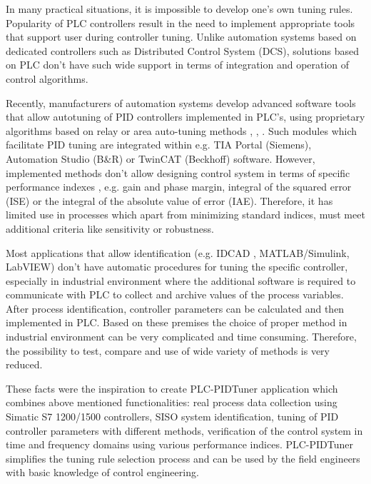 \documentclass{amcs}
\begin{document}
In many practical situations, it is impossible to develop one's own tuning rules. Popularity of PLC controllers result in the need to implement appropriate tools that support user during controller tuning. Unlike automation systems based on dedicated controllers such as Distributed Control System (DCS), solutions based on PLC don't have such wide support in terms of integration and operation of control algorithms. 

Recently, manufacturers of automation systems develop advanced software tools that allow autotuning of PID controllers implemented in PLC's, using  proprietary algorithms based on relay or area auto-tuning methods \cite{Astrom:1995}, \cite{Yu:2006}, \cite{Trybus:2011}. Such modules which facilitate PID tuning are integrated within e.g. TIA Portal (Siemens), Automation Studio (B\&R) or TwinCAT (Beckhoff) software. However, implemented  methods don't allow designing control system in terms of specific performance indexes \cite{Bishop:2010}, \cite{Mozaryn:2013} e.g. gain and phase margin, integral of the squared error (ISE) or the integral of the absolute value of error (IAE). Therefore, it has limited use in processes which apart from minimizing standard indices, must meet additional criteria like sensitivity or robustness. 

Most applications that allow identification (e.g. IDCAD \cite{Janiszowski:2002}, MATLAB/Simulink, LabVIEW) don't have automatic procedures for tuning the specific controller, especially in industrial environment where the additional software is required to communicate with PLC to collect and archive values of the process variables. After process identification, controller parameters can be calculated   \cite{Odwyer:2009} and then implemented in PLC. Based on these premises the choice of proper method in industrial environment can be very complicated and time consuming. Therefore, the possibility to test, compare and use of wide variety of methods is very reduced. 

These facts were the inspiration to create PLC-PIDTuner application which combines above mentioned functionalities: real process data collection using Simatic S7 1200/1500 controllers, SISO system identification, tuning of PID controller parameters with different methods, verification of the control system in time and frequency domains using various performance indices. PLC-PIDTuner simplifies the tuning rule selection process and can be used by the field engineers with basic knowledge of control engineering.
\end{document}
